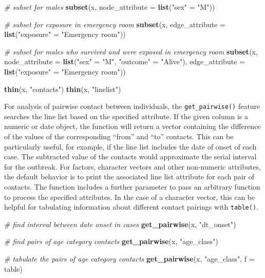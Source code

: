 \documentclass[9pt,a4paper,]{extarticle}
\newenvironment{Shaded}{\begin{snugshade}}{\end{snugshade}}
\newcommand{\KeywordTok}[1]{\textcolor[rgb]{0.13,0.29,0.53}{\textbf{#1}}}
\newcommand{\DataTypeTok}[1]{\textcolor[rgb]{0.13,0.29,0.53}{#1}}
\newcommand{\StringTok}[1]{\textcolor[rgb]{0.31,0.60,0.02}{#1}}
\newcommand{\CommentTok}[1]{\textcolor[rgb]{0.56,0.35,0.01}{\textit{#1}}}
\newcommand{\NormalTok}[1]{#1}
\theoremstyle{definition}
\theoremstyle{definition}
\theoremstyle{definition}
\theoremstyle{remark}
\begin{document}
\begin{Shaded}
\begin{Highlighting}[]
\CommentTok{# subset for males}
\KeywordTok{subset}\NormalTok{(x, }\DataTypeTok{node_attribute =} \KeywordTok{list}\NormalTok{(}\StringTok{"sex"}\NormalTok{ =}\StringTok{ "M"}\NormalTok{))}

\CommentTok{# subset for exposure in emergency room}
\KeywordTok{subset}\NormalTok{(x, }\DataTypeTok{edge_attribute =} \KeywordTok{list}\NormalTok{(}\StringTok{"exposure"}\NormalTok{ =}\StringTok{ "Emergency room"}\NormalTok{))}

\CommentTok{# subset for males who survived and were exposed in emergency room}
\KeywordTok{subset}\NormalTok{(x,}
       \DataTypeTok{node_attribute =} \KeywordTok{list}\NormalTok{(}\StringTok{"sex"}\NormalTok{ =}\StringTok{ "M"}\NormalTok{, }\StringTok{"outcome"}\NormalTok{ =}\StringTok{ "Alive"}\NormalTok{),}
       \DataTypeTok{edge_attribute =} \KeywordTok{list}\NormalTok{(}\StringTok{"exposure"}\NormalTok{ =}\StringTok{ "Emergency room"}\NormalTok{))}

\KeywordTok{thin}\NormalTok{(x, }\StringTok{"contacts"}\NormalTok{)}
\KeywordTok{thin}\NormalTok{(x, }\StringTok{"linelist"}\NormalTok{)  }
\end{Highlighting}
\end{Shaded}

For analysis of pairwise contact between individuals, the \texttt{get\_pairwise()} feature searches the line list based on the specified attribute. If the given column is a numeric or date object, the function will return a vector containing the difference of the values of the corresponding ``from'' and ``to'' contacts. This can be particularly useful, for example, if the line list includes the date of onset of each case. The subtracted value of the contacts would approximate the serial interval for the outbreak\citep{fine:2003}. For factors, character vectors and other non-numeric attributes, the default behavior is to print the associated line list attribute for each pair of contacts. The function includes a further parameter to pass an arbitrary function to process the specified attributes. In the case of a character vector, this can be helpful for tabulating information about different contact pairings with \texttt{table()}.

\begin{Shaded}
\begin{Highlighting}[]
\CommentTok{# find interval between date onset in cases}
\KeywordTok{get_pairwise}\NormalTok{(x, }\StringTok{"dt_onset"}\NormalTok{)}

\CommentTok{# find pairs of age category contacts}
\KeywordTok{get_pairwise}\NormalTok{(x, }\StringTok{"age_class"}\NormalTok{)}

\CommentTok{# tabulate the pairs of age category contacts}
\KeywordTok{get_pairwise}\NormalTok{(x, }\StringTok{"age_class"}\NormalTok{, }\DataTypeTok{f =}\NormalTok{ table)}
\end{Highlighting}
\end{Shaded}
\end{document}
